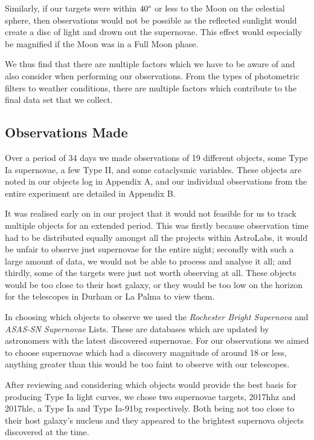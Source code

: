 \documentclass[twocolumn]{revtex4}
\begin{document}
Similarly, if our targets were within $40\degree$ or less to the Moon on the celestial sphere, then observations would not be possible as the reflected sunlight would create a disc of light and drown out the supernovae. This effect would especially be magnified if the Moon was in a Full Moon phase.

We thus find that there are multiple factors which we have to be aware of and also consider when performing our observations. From the types of photometric filters to weather conditions, there are multiple factors which contribute to the final data set that we collect.

\vspace{-3ex}
\subsection{Observations Made}
\label{observer-observations}
\vspace{-2ex}
Over a period of 34 days we made observations of 19 different objects, some Type Ia supernovae, a few Type II, and some cataclysmic variables. These objects are noted in our objects log in Appendix A, and our individual observations from the entire experiment are detailed in Appendix B.

It was realised early on in our project that it would not feasible for us to track multiple objects for an extended period. This was firstly because observation time had to be distributed equally amongst all the projects within AstroLabs, it would be unfair to observe just supernovae for the entire night; secondly with such a large amount of data, we would not be able to process and analyse it all; and thirdly, some of the targets were just not worth observing at all. These objects would be too close to their host galaxy, or they would be too low on the horizon for the telescopes in Durham or La Palma to view them.

In choosing which objects to observe we used the \textit{Rochester Bright Supernova} \cite{rochester_sn} and \textit{ASAS-SN Supernovae} \cite{asassn_sn} Lists. These are databases which are updated by astronomers with the latest discovered supernovae. For our observations we aimed to choose supernovae which had a discovery magnitude of around 18 or less, anything greater than this would be too faint to observe with our telescopes.

After reviewing and considering which objects would provide the best basis for producing Type Ia light curves, we chose two supernovae targets, 2017hhz and 2017hle, a Type Ia and Type Ia-91bg respectively. Both being not too close to their host galaxy's nucleus and they appeared to the brightest supernova objects discovered at the time.
\end{document}
